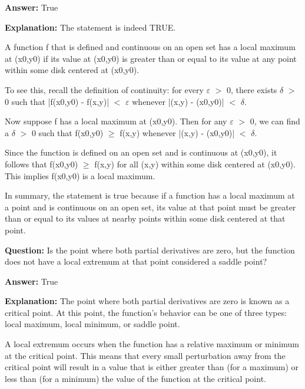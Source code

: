\documentclass{article}
\begin{document}
                \textbf{Answer:} True

                \textbf{Explanation:} The statement is indeed TRUE.

A function f that is defined and continuous on an open set has a local maximum at (x0,y0) if its value at (x0,y0) is greater than or equal to its value at any point within some disk centered at (x0,y0). 

To see this, recall the definition of continuity: for every \ensuremath{\varepsilon} \ensuremath{>} 0, there exists \ensuremath{\delta} \ensuremath{>} 0 such that |f(x0,y0) - f(x,y)| \ensuremath{<} \ensuremath{\varepsilon} whenever |(x,y) - (x0,y0)| \ensuremath{<} \ensuremath{\delta}. 

Now suppose f has a local maximum at (x0,y0). Then for any \ensuremath{\varepsilon} \ensuremath{>} 0, we can find a \ensuremath{\delta} \ensuremath{>} 0 such that f(x0,y0) \ensuremath{\geq} f(x,y) whenever |(x,y) - (x0,y0)| \ensuremath{<} \ensuremath{\delta}. 

Since the function is defined on an open set and is continuous at (x0,y0), it follows that f(x0,y0) \ensuremath{\geq} f(x,y) for all (x,y) within some disk centered at (x0,y0). This implies f(x0,y0) is a local maximum.

In summary, the statement is true because if a function has a local maximum at a point and is continuous on an open set, its value at that point must be greater than or equal to its values at nearby points within some disk centered at that point.
                
                \vspace{0.5cm} 
        
            
                \textbf {Question:} Is the point where both partial derivatives are zero, but the function does not have a local extremum at that point considered a saddle point?
                
                \textbf{Answer:} True

                \textbf{Explanation:} The point where both partial derivatives are zero is known as a critical point. At this point, the function's behavior can be one of three types: local maximum, local minimum, or saddle point.

A local extremum occurs when the function has a relative maximum or minimum at the critical point. This means that every small perturbation away from the critical point will result in a value that is either greater than (for a maximum) or less than (for a minimum) the value of the function at the critical point.
\end{document}
